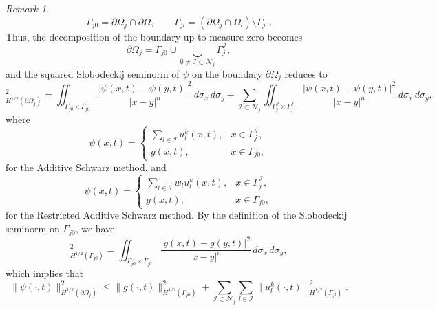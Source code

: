 \documentclass[a4paper, 11pt]{article}
\theoremstyle{remark}
\newtheorem{remark}[equation]{Remark}
\begin{document}
\begin{remark}
    \begin{equation*}
        \Gamma_{j0} = \partial \Omega_{j} \cap \partial\Omega, \qquad \Gamma_{jl} = \left(\partial\Omega_{j}\cap\Omega_{l}\right)\setminus \Gamma_{j0}.
    \end{equation*}
    Thus, the decomposition of the boundary up to measure zero becomes
    \begin{equation*}
        \partial\Omega_{j} = \Gamma_{j0} \cup \bigcup_{\emptyset \neq \mathcal{I}\subset\mathcal{N}_{j}}\Gamma_{j}^{\mathcal{I}},
    \end{equation*}
    and the squared Slobodeckij seminorm of $\psi$ on the boundary $\partial\Omega_{j}$ reduces to
    \begin{equation*}
         [\psi]_{H^{1/2}(\partial\Omega_j)}^2 = \iint_{\Gamma_{j0} \times \Gamma_{j0}} \frac{|\psi(x, t)-\psi(y, t)|^2}{|x-y|^n} \, d\sigma_x \, d\sigma_y + \sum_{\mathcal{I}\subset\mathcal{N}_{j}} \iint_{\Gamma_j^{\mathcal{I}} \times \Gamma_j^{\mathcal{I}}} \frac{|\psi(x, t)-\psi(y, t)|^2}{|x-y|^n} \, d\sigma_x \, d\sigma_y,
    \end{equation*}
    where
    \begin{equation*}
        \psi(x, t) = 
        \begin{cases}
            \sum_{l\in\mathcal{I}}u_{l}^{k}(x, t), & x\in \Gamma_{j}^{\mathcal{I}},\\
            g(x, t), & x\in \Gamma_{j0},
        \end{cases}
    \end{equation*}
    for the Additive Schwarz method, and
    \begin{equation*}
        \psi(x, t) = 
        \begin{cases}
            \sum_{l\in\mathcal{I}}w_{l}u_{l}^{k}(x, t), & x\in \Gamma_{j}^{\mathcal{I}},\\
            g(x, t), & x\in \Gamma_{j0},
        \end{cases}
    \end{equation*}
    for the Restricted Additive Schwarz method. By the definition of the Slobodeckij seminorm on $\Gamma_{j0}$, we have
    \begin{equation*}
        [g(\cdot, t)]^{2}_{H^{1/2}(\Gamma_{j0})} = \iint_{\Gamma_{j0} \times \Gamma_{j0}} \frac{|g(x, t) - g(y, t)|^2}{|x-y|^n} \, d\sigma_x \, d\sigma_y,
    \end{equation*}
    which implies that
    \begin{equation*}
        \lVert \psi(\cdot, t)\rVert_{H^{1/2}(\partial\Omega_{j})}^{2} \leq \lVert g(\cdot, t)\rVert_{H^{1/2}(\Gamma_{j0})}^{2} + \sum_{\mathcal{I}\subset\mathcal{N}_{j}}\sum_{l\in\mathcal{I}}\lVert u_{l}^{k}(\cdot, t)\rVert_{H^{1/2}(\Gamma_{jl})}^{2}.

\end{equation*}
\end{remark}
\end{document}
